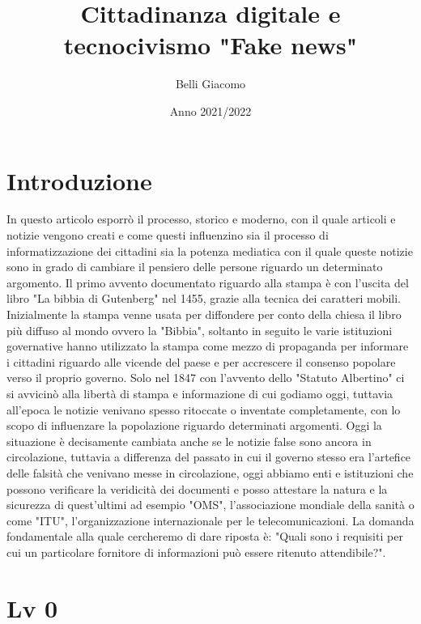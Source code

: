 \documentclass{article}
\title{Cittadinanza digitale e tecnocivismo "Fake news"}
\author{Belli Giacomo }
\date{Anno 2021/2022}
\begin{document}
\maketitle
\section{Introduzione}
In questo articolo esporrò il processo, storico e moderno, con il quale articoli e notizie vengono creati e come questi influenzino sia il processo di informatizzazione dei cittadini sia la potenza mediatica con il quale queste notizie sono in grado di cambiare il pensiero delle persone riguardo un determinato argomento.
Il primo avvento documentato riguardo alla stampa è con l'uscita del libro "La bibbia di Gutenberg" \cite{linzer2008gutenberg} nel 1455, grazie alla tecnica dei caratteri mobili.
Inizialmente la stampa venne usata per diffondere per conto della chiesa il libro più diffuso al mondo ovvero la "Bibbia", soltanto in seguito le varie istituzioni governative hanno utilizzato la stampa come mezzo di propaganda per informare i cittadini riguardo alle vicende del paese e per accrescere il consenso popolare verso il proprio governo.
Solo nel 1847 con l'avvento dello "Statuto Albertino" ci si avvicinò alla libertà di stampa e informazione di cui godiamo oggi, tuttavia all'epoca le notizie venivano spesso ritoccate o inventate completamente, con lo scopo di influenzare la popolazione riguardo determinati argomenti.
Oggi la situazione è decisamente cambiata anche se le notizie false sono ancora in circolazione, tuttavia a differenza del passato in cui il governo stesso era l'artefice delle falsità che venivano messe in circolazione, oggi abbiamo enti e istituzioni che possono verificare la veridicità dei documenti e posso attestare la natura e la sicurezza di quest'ultimi ad esempio "OMS", l'associazione mondiale della sanità o come "ITU", l'organizzazione internazionale per le telecomunicazioni.
La domanda fondamentale alla quale cercheremo di dare riposta è: "Quali sono i requisiti per cui un particolare fornitore di informazioni può essere ritenuto attendibile?".
\section{Lv 0}
\end{document}
